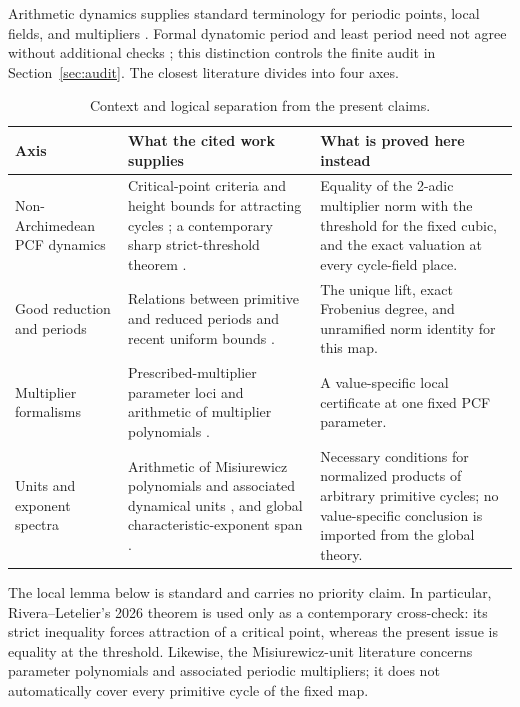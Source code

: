 \documentclass[11pt]{article}
\theoremstyle{definition}
\theoremstyle{remark}
\begin{document}
Arithmetic dynamics supplies standard terminology for periodic points,
local fields, and multipliers \citep{silverman2007arithmetic}.  Formal
dynatomic period and least period need not agree without additional checks
\citep{morton1994rational}; this distinction controls the finite audit in
Section~\ref{sec:audit}.  The closest literature divides into four axes.

\begin{table}[tbp]
\centering
\caption{Context and logical separation from the present claims.}
\label{tab:related}
\footnotesize
\begin{tabularx}{\textwidth}{@{}p{}Y Y@{}}
\toprule
Axis & What the cited work supplies & What is proved here instead \\
\midrule
Non-Archimedean PCF dynamics
& Critical-point criteria and height bounds for attracting cycles
  \citep{benedettoetal2014attracting}; a contemporary sharp strict-threshold
  theorem \citep{riveraletelier2026critical}.
& Equality of the 2-adic multiplier norm with the threshold for the fixed
  cubic, and the exact valuation at every cycle-field place. \\
Good reduction and periods
& Relations between primitive and reduced periods
  \citep{hutz2009good} and recent uniform bounds
  \citep{rajagopalzhang2025uniform}.
& The unique lift, exact Frobenius degree, and unramified norm identity for
  this map. \\
Multiplier formalisms
& Prescribed-multiplier parameter loci
  \citep{buffgauthier2015quadratic} and arithmetic of multiplier
  polynomials \citep{murakami2024arithmetic}.
& A value-specific local certificate at one fixed PCF parameter. \\
Units and exponent spectra
& Arithmetic of Misiurewicz polynomials and associated dynamical units
  \citep{benedettogoksel2023part1,benedettogoksel2024part2}, and global
  characteristic-exponent span \citep{jixiezhang2026space}.
& Necessary conditions for normalized products of arbitrary primitive
  cycles; no value-specific conclusion is imported from the global theory. \\
\bottomrule
\end{tabularx}
\end{table}

The local lemma below is standard and carries no priority claim.  In
particular, Rivera--Letelier's 2026 theorem is used only as a contemporary
cross-check: its strict inequality forces attraction of a critical point,
whereas the present issue is equality at the threshold.  Likewise, the
Misiurewicz-unit literature concerns parameter polynomials and associated
periodic multipliers; it does not automatically cover every primitive cycle
of the fixed map.
\end{document}
